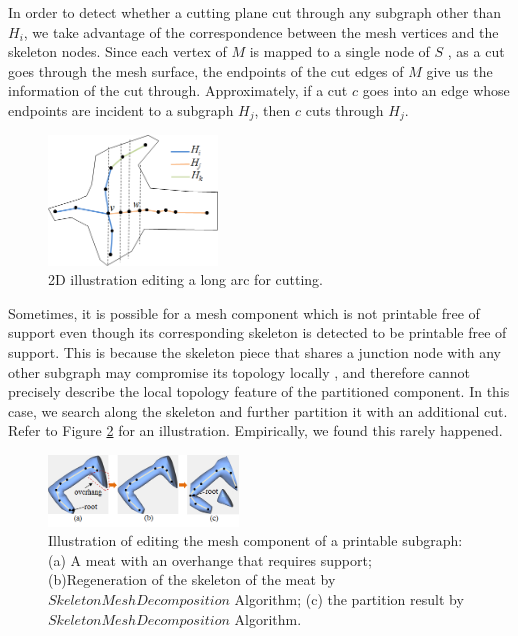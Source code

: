In order to detect whether a cutting plane cut through any subgraph other than $H_i$, we take advantage of the correspondence between the mesh vertices and the skeleton nodes. Since each vertex of $M$ is mapped to a single node of $S$ \cite{AuTCCL08}, as a cut goes through the mesh surface, the endpoints of the cut edges of $M$ give us the information of the cut through. Approximately, if a cut $c$ goes into an edge whose endpoints are incident to a subgraph $H_j$, then $c$ cuts through $H_j$.






\begin{figure}[tbp]
  \centering
  \mbox{} \hfill
  \includegraphics[width=0.4\textwidth]{figs/forward_tracing.png}
  \caption{\label{fig:forward_tracing}%
           2D illustration editing a long arc for cutting.}
\end{figure}


Sometimes, it is possible for a mesh component which is not printable free of support even though its corresponding skeleton is detected to be printable free of support. This is because the skeleton piece that shares a junction node with any other subgraph may compromise its topology locally \cite{AuTCCL08}, and therefore cannot precisely describe the local topology feature of the partitioned component. In this case, we search along the skeleton and further partition it with an additional cut. Refer to Figure \ref{fig:arm} for an illustration. Empirically, we found this rarely happened.

\begin{figure}[tbp]
  \centering
  \mbox{} \hfill
  \includegraphics[width=0.45\textwidth]{figs/arm.png}
  \caption{\label{fig:arm}%
           Illustration of editing the mesh component of a printable subgraph:(a) A meat with an overhange that requires support; (b)Regeneration of the skeleton of the meat by $SkeletonMeshDecomposition$ Algorithm; (c) the partition result by $SkeletonMeshDecomposition$ Algorithm.}
\end{figure}









